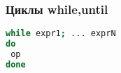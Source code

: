\begin{frame}[fragile]
\frametitle{Циклы while,until}
\begin{lstlisting}[language=sh,frame=single]
while expr1; ... exprN
do
 op
done
\end{lstlisting}
\end{frame}
